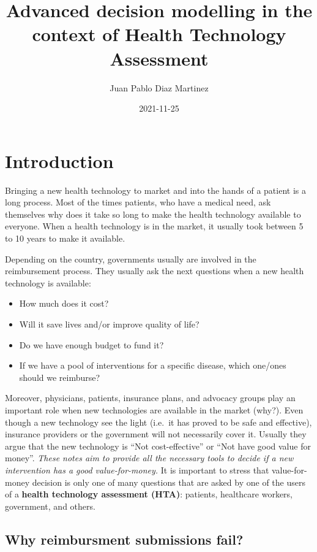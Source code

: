 \documentclass[
]{book}
\title{Advanced decision modelling in the context of Health Technology Assessment}
\author{Juan Pablo Diaz Martinez}
\date{2021-11-25}
\providecommand{\tightlist}{%
  \setlength{\itemsep}{0pt}\setlength{\parskip}{0pt}}
\begin{document}
\maketitle

{
\setcounter{tocdepth}{1}
\tableofcontents
}
\hypertarget{introduction}{%
\chapter*{Introduction}\label{introduction}}

Bringing a new health technology to market and into the hands of a patient is a long process. Most of the times patients, who have a medical need, ask themselves why does it take so long to make the health technology available to everyone. When a health technology is in the market, it usually took between 5 to 10 years to make
it available.

Depending on the country, governments usually are involved in the reimbursement process. They usually ask the next questions when a new health technology is available:

\begin{itemize}
\tightlist
\item
  How much does it cost?
\item
  Will it save lives and/or improve quality of life?
\item
  Do we have enough budget to fund it?
\item
  If we have a pool of interventions for a specific disease, which one/ones should we reimburse?
\end{itemize}

Moreover, physicians, patients, insurance plans, and advocacy groups play an important role when new technologies are available in the market (why?). Even though a new technology see the light (i.e.~it has proved to be safe and effective), insurance providers or the government will not necessarily cover it. Usually they argue that the new technology is ``Not cost-effective'' or ``Not have good value for money''. \emph{These notes aim to provide all the necessary tools to decide if a new intervention has a good value-for-money.} It is important to stress that value-for-money decision is only one of many questions that are asked by one of the users of a \textbf{health technology assessment (HTA)}: patients, healthcare workers, government, and others.

\hypertarget{why-reimbursment-submissions-fail}{%
\section*{Why reimbursment submissions fail?}\label{why-reimbursment-submissions-fail}}
\end{document}
